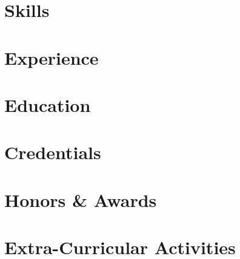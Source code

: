 \documentclass[letter,10pt]{article}
\begin{document}


\section{Skills}


\section{Experience}


\section{Education}


\section{Credentials}


\section{Honors \& Awards}


\section{Extra-Curricular Activities}

\end{document}
